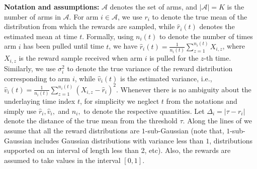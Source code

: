 \textbf{Notation and assumptions:} $\mathcal{A}$ denotes the set of arms, and $|\mathcal{A}|=K$ is the number of arms in $\mathcal{A}$. 
For arm $i\in\mathcal{A}$, we use $r_{i}$ to denote the true mean of the distribution from which the rewards are sampled, while $\hat{r}_{i}(t)$ denotes the estimated mean at time $t$. Formally, using $n_i(t)$ to denote the number of times arm $i$ has been pulled until time $t$, we have $\hat{r}_{i}(t)=\frac{1}{n_{i}(t)}\sum_{z=1}^{n_i(t)} X_{i,z}$, where $X_{i,z}$ is the reward sample received when arm $i$ is pulled for the $z$-th time. %
Similarly, we use $\sigma_{i}^{2}$ to denote the true variance of the reward distribution corresponding to arm $i$, while $\hat{v}_{i}(t)$ is the estimated variance, i.e., $\hat{v}_{i}(t)=\frac{1}{n_i(t)}\sum_{z=1}^{n_{i}(t)}(X_{i,z}-\hat{r}_{i})^{2}$. Whenever there is no ambiguity about the underlaying  time index $t$, for simplicity we neglect $t$ from the notations and simply use  $\hat{r}_i, \hat{v}_i,$ and $n_i, $ to denote the respective quantities.  Let  $\Delta_{i}=|\tau-r_{i}|$ denote the distance of the true mean from the threshold $\tau$. Along the lines of \cite{locatelli2016optimal} we assume that all the reward distributions 
are $1$-sub-Gaussian (note that,  $1$-sub-Gaussian includes Gaussian distributions with variance less than $1$, distributions supported on an interval of length less than 2, etc). Also, the rewards are assumed to take values in the interval $[0,1]$.

